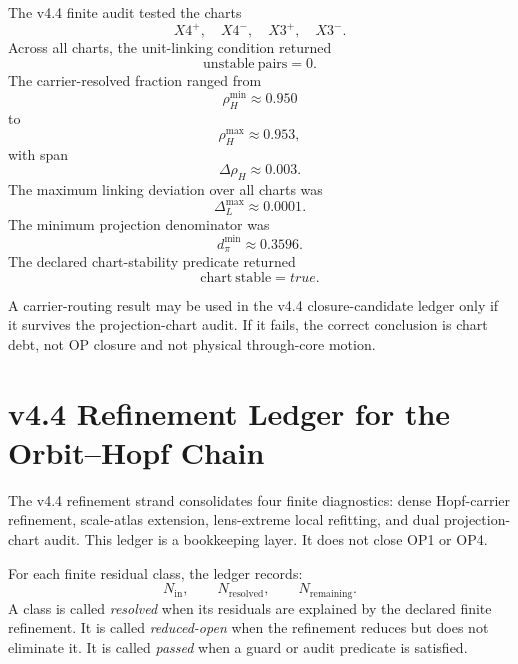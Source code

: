 \begin{remark}
The v4.4 finite audit tested the charts
\[
    X4^+,\quad X4^-,\quad X3^+,\quad X3^-.
\]
Across all charts, the unit-linking condition returned
\[
    \mathrm{unstable\ pairs}=0.
\]
The carrier-resolved fraction ranged from
\[
    \rho_H^{\min}\approx 0.950
\]
to
\[
    \rho_H^{\max}\approx 0.953,
\]
with span
\[
    \Delta\rho_H\approx 0.003.
\]
The maximum linking deviation over all charts was
\[
    \Delta_L^{\max}\approx 0.0001.
\]
The minimum projection denominator was
\[
    d_{\pi}^{\min}\approx 0.3596.
\]
The declared chart-stability predicate returned
\[
    \mathrm{chart\ stable}=true.
\]
\end{remark}

\begin{theorem}
A carrier-routing result may be used in the v4.4 closure-candidate ledger only
if it survives the projection-chart audit.  If it fails, the correct conclusion
is chart debt, not OP closure and not physical through-core motion.
\end{theorem}



\section{v4.4 Refinement Ledger for the Orbit--Hopf Chain}
\label{sec:v44-refinement-ledger-orbit-hopf-chain}

The v4.4 refinement strand consolidates four finite diagnostics:
dense Hopf-carrier refinement, scale-atlas extension, lens-extreme local
refitting, and dual projection-chart audit.  This ledger is a bookkeeping
layer.  It does not close OP1 or OP4.

\begin{definition}
For each finite residual class, the ledger records:
\[
    N_{\mathrm{in}},\qquad
    N_{\mathrm{resolved}},\qquad
    N_{\mathrm{remaining}}.
\]
A class is called \emph{resolved} when its residuals are explained by the
declared finite refinement.  It is called \emph{reduced-open} when the
refinement reduces but does not eliminate it.  It is called \emph{passed} when
a guard or audit predicate is satisfied.
\end{definition}

